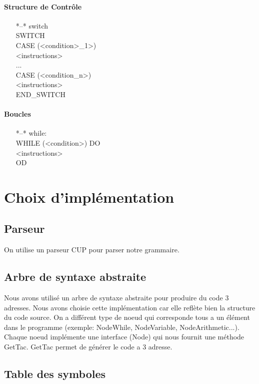 \documentclass[10pt,a4paper]{report}
\begin{document}
\paragraph{Structure de Contrôle}
\begin{itemize}
\item[*--*]switch\:
	\\SWITCH
	\\ CASE (<condition>\_1>)
	\\	<instructions>
	\\...
	\\CASE (<condition\_n>)
	\\	<instructions>
	\\END\_SWITCH
\end{itemize}

\paragraph{Boucles}
\begin{itemize}

\item[*--*]while:
	\\WHILE (<condition>) DO
		\\<instructions>
	\\OD

\end{itemize}

\section{Choix d'implémentation}

\subsection{Parseur}
On utilise un parseur CUP pour parser notre grammaire.


\subsection{Arbre de syntaxe abstraite}

Nous avons utilisé un arbre de syntaxe abstraite pour produire du code 3 adresses.
Nous avons choisie cette implémentation car elle reflète bien la structure du code source.
On a différent type de noeud qui corresponde tous a un élément dans le programme (exemple: NodeWhile, NodeVariable, NodeArithmetic...).
Chaque noeud implémente une interface (Node) qui nous fournit une méthode GetTac.
GetTac permet de générer le code a 3 adresse.



\subsection{Table des symboles}
\end{document}
